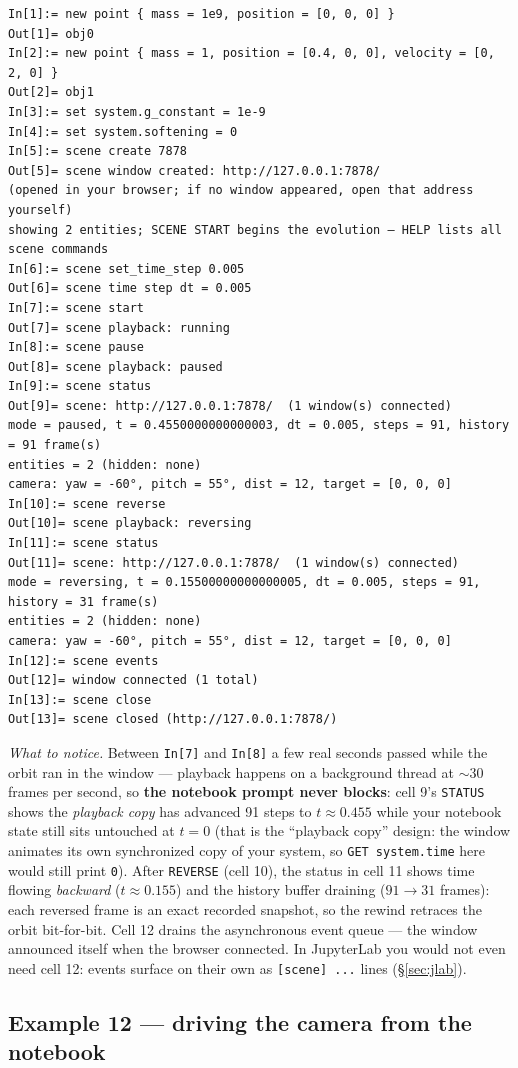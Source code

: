 \documentclass[11pt]{article}
\newcommand{\kw}[1]{\texttt{\uppercase{#1}}}
\newcommand{\code}[1]{\texttt{#1}}
\begin{document}
\begin{lstlisting}
In[1]:= new point { mass = 1e9, position = [0, 0, 0] }
Out[1]= obj0
In[2]:= new point { mass = 1, position = [0.4, 0, 0], velocity = [0, 2, 0] }
Out[2]= obj1
In[3]:= set system.g_constant = 1e-9
In[4]:= set system.softening = 0
In[5]:= scene create 7878
Out[5]= scene window created: http://127.0.0.1:7878/
(opened in your browser; if no window appeared, open that address yourself)
showing 2 entities; SCENE START begins the evolution — HELP lists all scene commands
In[6]:= scene set_time_step 0.005
Out[6]= scene time step dt = 0.005
In[7]:= scene start
Out[7]= scene playback: running
In[8]:= scene pause
Out[8]= scene playback: paused
In[9]:= scene status
Out[9]= scene: http://127.0.0.1:7878/  (1 window(s) connected)
mode = paused, t = 0.4550000000000003, dt = 0.005, steps = 91, history = 91 frame(s)
entities = 2 (hidden: none)
camera: yaw = -60°, pitch = 55°, dist = 12, target = [0, 0, 0]
In[10]:= scene reverse
Out[10]= scene playback: reversing
In[11]:= scene status
Out[11]= scene: http://127.0.0.1:7878/  (1 window(s) connected)
mode = reversing, t = 0.15500000000000005, dt = 0.005, steps = 91, history = 31 frame(s)
entities = 2 (hidden: none)
camera: yaw = -60°, pitch = 55°, dist = 12, target = [0, 0, 0]
In[12]:= scene events
Out[12]= window connected (1 total)
In[13]:= scene close
Out[13]= scene closed (http://127.0.0.1:7878/)
\end{lstlisting}

\emph{What to notice.} Between \code{In[7]} and \code{In[8]} a few
real seconds passed while the orbit ran in the window --- playback
happens on a background thread at $\sim$30 frames per second, so
\textbf{the notebook prompt never blocks}: cell 9's \kw{status} shows
the \emph{playback copy} has advanced 91 steps to $t \approx 0.455$
while your notebook state still sits untouched at $t = 0$ (that is the
``playback copy'' design: the window animates its own synchronized
copy of your system, so \code{GET system.time} here would still print
\code{0}). After \kw{reverse} (cell 10), the status in cell 11 shows
time flowing \emph{backward} ($t \approx 0.155$) and the history
buffer draining ($91 \to 31$ frames): each reversed frame is an exact
recorded snapshot, so the rewind retraces the orbit bit-for-bit. Cell
12 drains the asynchronous event queue --- the window announced itself
when the browser connected. In JupyterLab you would not even need cell
12: events surface on their own as \code{[scene] ...} lines
(\S\ref{sec:jlab}).

\subsection{Example 12 --- driving the camera from the notebook}
\end{document}
